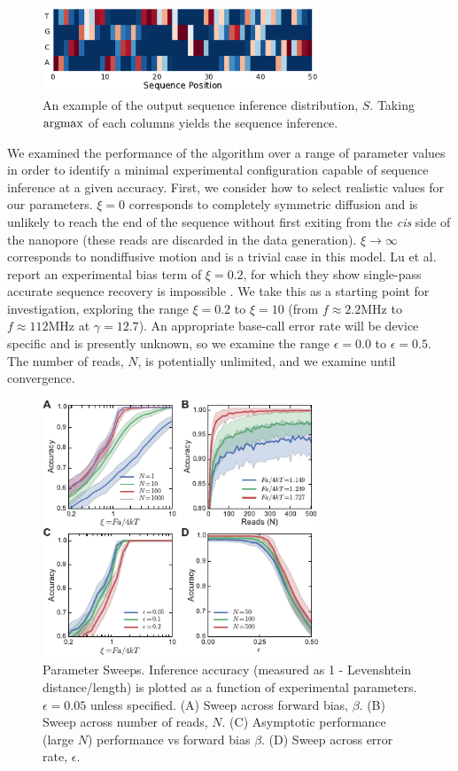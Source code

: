 \documentclass{biophys_letter}
\newcommand{\argmax}{\operatornamewithlimits{argmax}}
\newcommand{\mhz}{\si{\mega\hertz}}
\newcommand{\bias}{\beta}
\newcommand{\err}{\epsilon}
\begin{document}
\begin{figure}
  \centering
  \includegraphics[width=3.25in]{fig/fig2_new.pdf}
  \caption{An example of the output sequence inference distribution, $S$. Taking $\argmax$ of each columns yields the sequence inference.}
  \label{fig:inference_output}
\end{figure}

We examined the performance of the algorithm over a range of parameter values in order to identify a minimal experimental configuration capable of sequence inference at a given accuracy.
First, we consider how to select realistic values for our parameters.
$\xi=0$ corresponds to completely symmetric diffusion and is unlikely to reach the end of the sequence without first exiting from the {\it cis} side of the nanopore (these reads are discarded in the data generation).
$\xi\rightarrow\infty$ corresponds to nondiffusive motion and is a trivial case in this model.
Lu et al. report an experimental bias term of $\xi=0.2$, for which they show single-pass accurate sequence recovery is impossible \cite{Lu:2011}.
We take this as a starting point for investigation, exploring the range $\xi=0.2$ to $\xi=10$ (from $f\approx2.2\mhz$ to $f\approx112\mhz$ at $\gamma=12.7$).
An appropriate base-call error rate will be device specific and is presently unknown, so we examine the range $\err=0.0$ to $\err=0.5$.
The number of reads, $N$, is potentially unlimited, and we examine until convergence.

\begin{figure}
  \centering
  \includegraphics[width=3.25in]{fig/fig3_new.pdf}
  \caption{Parameter Sweeps. Inference accuracy (measured as 1 - Levenshtein distance/length) is plotted as a function of experimental parameters. $\epsilon=0.05$ unless specified. (A) Sweep across forward bias, $\beta$. (B) Sweep across number of reads, $N$. (C) Asymptotic performance (large $N$) performance vs forward bias $\bias$. (D) Sweep across error rate, $\epsilon$.}
  \label{fig:parameter_sweeps}
\end{figure}
\end{document}
